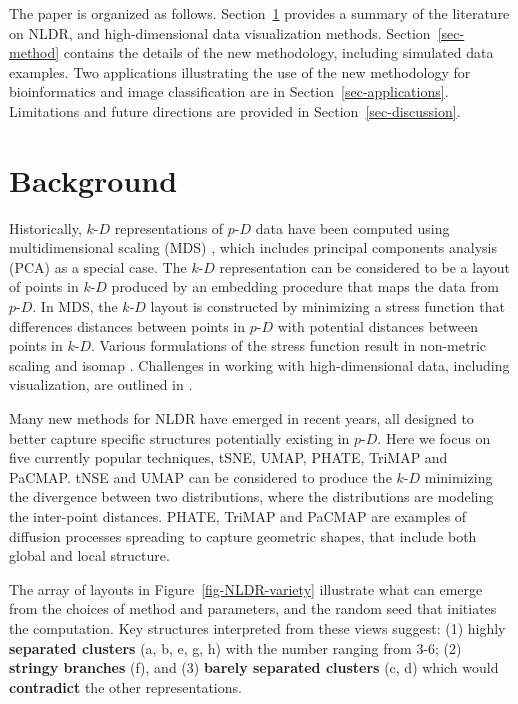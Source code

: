 \documentclass[
  12pt]{article}
\newcommand\pD{$p\text{-}D$}
\newcommand\kD{$k\text{-}D$}
\begin{document}
The paper is organized as follows. Section~\ref{sec-background} provides
a summary of the literature on NLDR, and high-dimensional data
visualization methods. Section~\ref{sec-method} contains the details of
the new methodology, including simulated data examples. Two applications
illustrating the use of the new methodology for bioinformatics and image
classification are in Section~\ref{sec-applications}. Limitations and
future directions are provided in Section~\ref{sec-discussion}.

\section{Background}\label{sec-background}

Historically, \kD{} representations of \pD{} data have been computed
using multidimensional scaling (MDS) \citep{borg2005}, which includes
principal components analysis (PCA) \citep{jolliffe2011} as a special
case. The \kD{} representation can be considered to be a layout of
points in \kD{} produced by an embedding procedure that maps the data
from \pD{}. In MDS, the \kD{} layout is constructed by minimizing a
stress function that differences distances between points in \pD{} with
potential distances between points in \kD{}. Various formulations of the
stress function result in non-metric scaling \citep{saeed2018} and
isomap \citep{silva2002}. Challenges in working with high-dimensional
data, including visualization, are outlined in \citet{johnstone2009}.

Many new methods for NLDR have emerged in recent years, all designed to
better capture specific structures potentially existing in \pD{}. Here
we focus on five currently popular techniques, tSNE, UMAP, PHATE, TriMAP
and PaCMAP. tNSE and UMAP can be considered to produce the \kD{}
minimizing the divergence between two distributions, where the
distributions are modeling the inter-point distances. PHATE, TriMAP and
PaCMAP are examples of diffusion processes \citep{coifman2005} spreading
to capture geometric shapes, that include both global and local
structure.

The array of layouts in Figure~\ref{fig-NLDR-variety} illustrate what
can emerge from the choices of method and parameters, and the random
seed that initiates the computation. Key structures interpreted from
these views suggest: (1) highly \textbf{separated clusters} (a, b, e, g,
h) with the number ranging from 3-6; (2) \textbf{stringy branches} (f),
and (3) \textbf{barely separated clusters} (c, d) which would
\textbf{contradict} the other representations.
\end{document}
